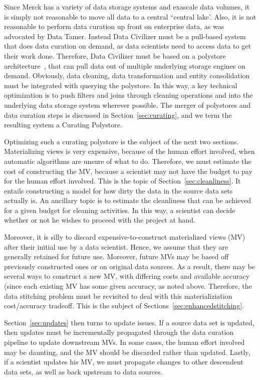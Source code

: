 Since Merck has a variety of data storage systems and exascale data volumes, it
is simply not reasonable to move all data to a central ``central lake'. Also, it is
not reasonable to perform data curation up front on enterprise data, as was
advocated by Data Tamer.  Instead Data Civilizer must be a pull-based system
that does data curation on demand, as data scientists need to access data to get
their work done.  Therefore, Data Civilizer must be based on a polystore
architecture~\cite{DBLP:journals/sigmod/DugganESBHKMMMZ15}, that can pull data out of multiple underlying storage
engines on demand.  Obviously, data cleaning, data transformation and entity
consolidation must be integrated with querying the polystore.  In this way, a
key technical optimization is to push filters and joins through cleaning
operations and into the underlying data storage system wherever possible.  The
merger of polystores and data curation steps is discussed in Section~\ref{sec:curating}, and we
term the resulting system a Curating Polystore.  

Optimizing such a curating polystore is the subject of the next two sections.
Materializing views is very expensive, because of the human effort involved,
when automatic algorithms are unsure of what to do.  Therefore, we must estimate
the cost of constructing the MV, because a scientist may not have the budget to
pay for the human effort involved.  This is the topic of Section~\ref{sec:cleanliness}.  It entails
constructing a model for how dirty the data in the source data sets actually is.
An ancillary topic is to estimate the cleanliness that can be achieved for a
given budget for cleaning activities.  In this way, a scientist can decide
whether or not he wishes to proceed with the project at hand.

Moreover, it is silly to discard expensive-to-construct materialized views (MV)
after their initial use by a data scientist.  Hence, we assume that they are
generally retained for future use.  Moreover, future MVs may be based off
previously constructed ones or on original data sources.  As a result, there may
be several ways to construct a new MV, with differing costs and available
accuracy (since each existing MV has some given accuracy, as noted above.
Therefore, the data stitching problem must be revisited to deal with this
materializiation cost/accuracy tradeoff.  This is the subject of Sections~\ref{sec:enhancedstitching}.

Section~\ref{sec:updates} then turns to update issues.   If a source data set is updated, then
updates must be incrementally propagated through the data curation pipeline to
update downstream MVs.  In some cases, the human effort involved may be
daunting, and the MV should be discarded rather than updated.  Lastly, if a
scientist updates his MV, we must propagate changes to other descendent data
sets, as well as back upstream to data sources. 


